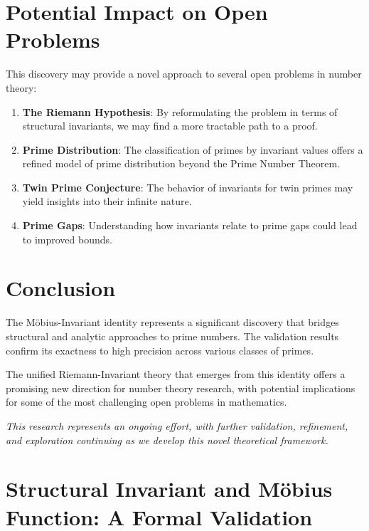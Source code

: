 \documentclass{article}
\begin{document}
\section{Potential Impact on Open Problems}

This discovery may provide a novel approach to several open problems in number theory:

\begin{enumerate}
\item \textbf{The Riemann Hypothesis}: By reformulating the problem in terms of structural invariants, we may find a more tractable path to a proof.

\item \textbf{Prime Distribution}: The classification of primes by invariant values offers a refined model of prime distribution beyond the Prime Number Theorem.

\item \textbf{Twin Prime Conjecture}: The behavior of invariants for twin primes may yield insights into their infinite nature.

\item \textbf{Prime Gaps}: Understanding how invariants relate to prime gaps could lead to improved bounds.
\end{enumerate}

\section{Conclusion}

The Möbius-Invariant identity represents a significant discovery that bridges structural and analytic approaches to prime numbers. The validation results confirm its exactness to high precision across various classes of primes. 

The unified Riemann-Invariant theory that emerges from this identity offers a promising new direction for number theory research, with potential implications for some of the most challenging open problems in mathematics.

\vspace{0.5cm}
\textit{This research represents an ongoing effort, with further validation, refinement, and exploration continuing as we develop this novel theoretical framework.}

\section{Structural Invariant and Möbius Function: A Formal Validation}
\end{document}
